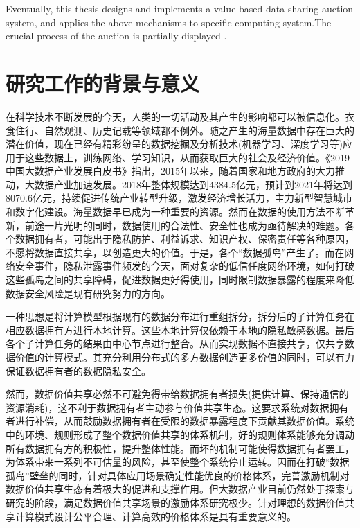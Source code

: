 \documentclass[promaster]{thesis-uestc}
\begin{document}
\begin{englishabstract}
Eventually, this thesis designs and implements a value-based data sharing auction system, and applies the above mechanisms to specific computing system.The crucial process of the auction is partially displayed .

\end{englishabstract}

\thesistableofcontents

\thesischapterexordium

\section{研究工作的背景与意义}

在科学技术不断发展的今天，人类的一切活动及其产生的影响都可以被信息化。衣食住行、自然观测、历史记载等领域都不例外。随之产生的海量数据中存在巨大的潜在价值，现在已经有精彩纷呈的数据挖掘及分析技术(机器学习、深度学习等)应用于这些数据上，训练网络、学习知识，从而获取巨大的社会及经济价值。《2019中国大数据产业发展白皮书》\cite{2019baipishu}指出，2015年以来，随着国家和地方政府的大力推动，大数据产业加速发展。2018年整体规模达到4384.5亿元，预计到2021年将达到8070.6亿元，持续促进传统产业转型升级，激发经济增长活力，主力新型智慧城市和数字化建设。海量数据早已成为一种重要的资源。然而在数据的使用方法不断革新，前途一片光明的同时，数据使用的合法性、安全性也成为亟待解决的难题。各个数据拥有者，可能出于隐私防护、利益诉求、知识产权、保密责任等各种原因，不愿将数据直接共享，以创造更大的价值。于是，各个“数据孤岛”产生了。而在网络安全事件，隐私泄露事件频发的今天，面对复杂的低信任度网络环境，如何打破这些孤岛之间的共享障碍，促进数据更好得使用，同时限制数据暴露的程度来降低数据安全风险是现有研究努力的方向。

一种思想是将计算模型根据现有的数据分布进行重组拆分，拆分后的子计算任务在相应数据拥有方进行本地计算。这些本地计算仅依赖于本地的隐私敏感数据。最后各个子计算任务的结果由中心节点进行整合。从而实现数据不直接共享，仅共享数据价值的计算模式。其充分利用分布式的多方数据创造更多价值的同时，可以有力保证数据拥有者的数据隐私安全。


然而，数据价值共享必然不可避免得带给数据拥有者损失(提供计算、保持通信的资源消耗)，这不利于数据拥有者主动参与价值共享生态。这要求系统对数据拥有者进行补偿，从而鼓励数据拥有者在受限的数据暴露程度下贡献其数据价值。系统中的环境、规则形成了整个数据价值共享的体系机制，好的规则体系能够充分调动所有数据拥有方的积极性，提升整体性能。而坏的机制可能使得数据拥有者罢工，为体系带来一系列不可估量的风险，甚至使整个系统停止运转。因而在打破“数据孤岛”壁垒的同时，针对具体应用场景确定性能优良的价格体系，完善激励机制对数据价值共享生态有着极大的促进和支撑作用。但大数据产业目前仍然处于探索与研究的阶段，满足数据价值共享场景的激励体系研究极少。针对理想的数据价值共享计算模式设计公平合理、计算高效的价格体系是具有重要意义的。
\end{document}
